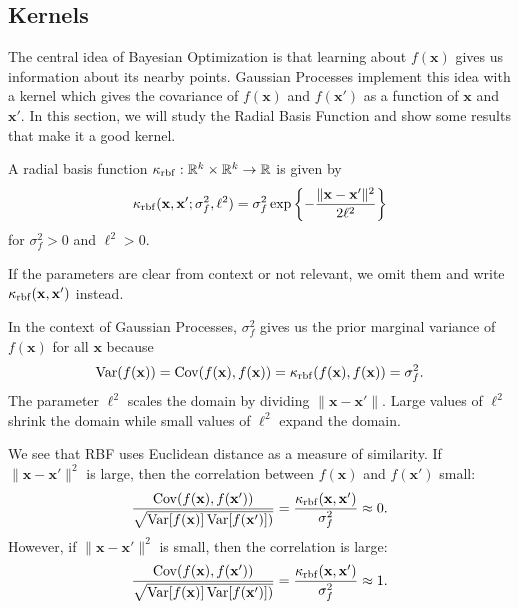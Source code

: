 \subsection{Kernels}

The central idea of Bayesian Optimization is that learning about $f(\mathbf{x})$ gives us information about its nearby points.
Gaussian Processes implement this idea with a kernel which gives the covariance of $f(\mathbf{x})$ and $f(\mathbf{x}')$
as a function of $\mathbf{x}$ and $\mathbf{x}'$.
In this section, we will study the Radial Basis Function and show some results that make it a good kernel.

\begin{definition}
    A radial basis function $\kappa_{\mathrm{rbf}}: \mathbb{R}^{k} \times \mathbb{R}^{k} \to \mathbb{R}$
    is given by
    \begin{equation*}
        \kappa_{\mathrm{rbf}}(\mathbf{x}, \mathbf{x}'; \sigma_f^2, \ell^2)
        = \sigma_f^{2} \exp \left\{ - \frac{ \lVert \mathbf{x} - \mathbf{x}' \rVert^2 }{ 2 \ell^2 }\right\}
    \end{equation*}
    for $\sigma_f^2 > 0$ and $\ell^2 > 0$.

    If the parameters are clear from context or not relevant, we omit them and write $\kappa_{\mathrm{rbf}}(\mathbf{x}, \mathbf{x}')$ instead.
\end{definition}
In the context of Gaussian Processes, $\sigma_f^2$ gives us the prior marginal variance of $f(\mathbf{x})$ for all $\mathbf{x}$ because
\begin{equation*}
    \operatorname{Var}(f(\mathbf{x})) = \operatorname{Cov}(f(\mathbf{x}), f(\mathbf{x})) = \kappa_{\mathrm{rbf}}(f(\mathbf{x}), f(\mathbf{x})) = \sigma_f^2.
\end{equation*}
The parameter $\ell^2$ scales the domain by dividing $\lVert \mathbf{x} - \mathbf{x}' \rVert$.
Large values of $\ell^2$ shrink the domain while small values of $\ell^2$ expand the domain.

We see that RBF uses Euclidean distance as a measure of similarity.
If $\lVert \mathbf{x} - \mathbf{x}' \rVert^2$ is large, then the correlation between $f(\mathbf{x})$ and $f(\mathbf{x}')$ small:
\[
    \frac{\operatorname{Cov}(f(\mathbf{x}), f(\mathbf{x}'))}{\sqrt{\operatorname{Var}[f(\mathbf{x})]\operatorname{Var}[f(\mathbf{x}')])}}
    = \frac{\kappa_{\mathrm{rbf}}(\mathbf{x}, \mathbf{x}')}{\sigma_f^2} \approx 0.
\]
However, if $\lVert \mathbf{x} - \mathbf{x}' \rVert^2$ is small, then the correlation is large:
\begin{equation*}
    \frac{\operatorname{Cov}(f(\mathbf{x}), f(\mathbf{x}'))}{\sqrt{\operatorname{Var}[f(\mathbf{x})]\operatorname{Var}[f(\mathbf{x}')])}}
    = \frac{\kappa_{\mathrm{rbf}}(\mathbf{x}, \mathbf{x}')}{\sigma_f^2} \approx 1.
\end{equation*}

